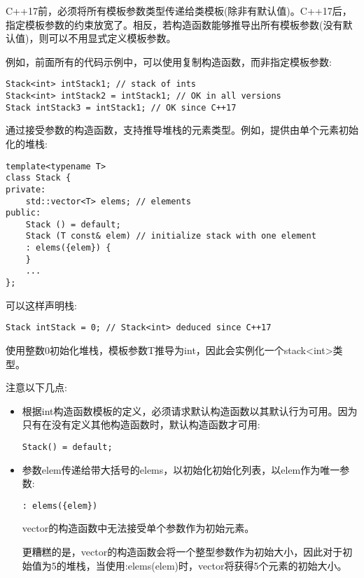C++17前，必须将所有模板参数类型传递给类模板(除非有默认值)。C++17后，指定模板参数的约束放宽了。相反，若构造函数能够推导出所有模板参数(没有默认值)，则可以不用显式定义模板参数。

例如，前面所有的代码示例中，可以使用复制构造函数，而非指定模板参数:

\begin{lstlisting}[style=styleCXX]
Stack<int> intStack1; // stack of ints
Stack<int> intStack2 = intStack1; // OK in all versions
Stack intStack3 = intStack1; // OK since C++17
\end{lstlisting}

通过接受参数的构造函数，支持推导堆栈的元素类型。例如，提供由单个元素初始化的堆栈:

\begin{lstlisting}[style=styleCXX]
template<typename T>
class Stack {
private:
	std::vector<T> elems; // elements
public:
	Stack () = default;
	Stack (T const& elem) // initialize stack with one element
	: elems({elem}) {
	}
	...
};
\end{lstlisting}

可以这样声明栈:

\begin{lstlisting}[style=styleCXX]
Stack intStack = 0; // Stack<int> deduced since C++17
\end{lstlisting}

使用整数0初始化堆栈，模板参数T推导为int，因此会实例化一个stack<int>类型。

注意以下几点:

\begin{itemize}
\item 
根据int构造函数模板的定义，必须请求默认构造函数以其默认行为可用。因为只有在没有定义其他构造函数时，默认构造函数才可用:
\begin{lstlisting}[style=styleCXX]
Stack() = default;
\end{lstlisting}

\item 
参数elem传递给带大括号的elems，以初始化初始化列表，以elem作为唯一参数:
\begin{lstlisting}[style=styleCXX]
: elems({elem})
\end{lstlisting}
vector的构造函数中无法接受单个参数作为初始元素。

\begin{tcolorbox}[colback=webgreen!5!white,colframe=webgreen!75!black]
\hspace*{0.75cm}更糟糕的是，vector的构造函数会将一个整型参数作为初始大小，因此对于初始值为5的堆栈，当使用:elems(elem)时，vector将获得5个元素的初始大小。
\end{tcolorbox}

\end{itemize}

